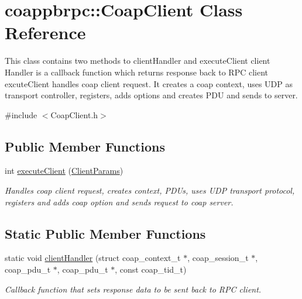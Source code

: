 \hypertarget{classcoappbrpc_1_1CoapClient}{}\section{coappbrpc\+:\+:Coap\+Client Class Reference}
\label{classcoappbrpc_1_1CoapClient}


This class contains two methods to client\+Handler and execute\+Client client Handler is a callback function which returns response back to R\+PC client excute\+Client handles coap client request. It creates a coap context, uses U\+DP as transport controller, registers, adds options and creates P\+DU and sends to server.  




{\ttfamily \#include $<$Coap\+Client.\+h$>$}

\subsection*{Public Member Functions}
\begin{DoxyCompactItemize}
\item 
int \hyperlink{classcoappbrpc_1_1CoapClient_ac622e2dd087135defc27d8d4401a3119}{execute\+Client} (\hyperlink{structClientParams}{Client\+Params})
\begin{DoxyCompactList}\small\item\em Handles coap client request, creates context, P\+D\+Us, uses U\+DP transport protocol, registers and adds coap option and sends request to coap server. \end{DoxyCompactList}\end{DoxyCompactItemize}
\subsection*{Static Public Member Functions}
\begin{DoxyCompactItemize}
\item 
static void \hyperlink{classcoappbrpc_1_1CoapClient_ab27b2485df1e7213425fe0f1b75110fa}{client\+Handler} (struct coap\+\_\+context\+\_\+t $\ast$, coap\+\_\+session\+\_\+t $\ast$, coap\+\_\+pdu\+\_\+t $\ast$, coap\+\_\+pdu\+\_\+t $\ast$, const coap\+\_\+tid\+\_\+t)
\begin{DoxyCompactList}\small\item\em Callback function that sets response data to be sent back to R\+PC client. \end{DoxyCompactList}\end{DoxyCompactItemize}
